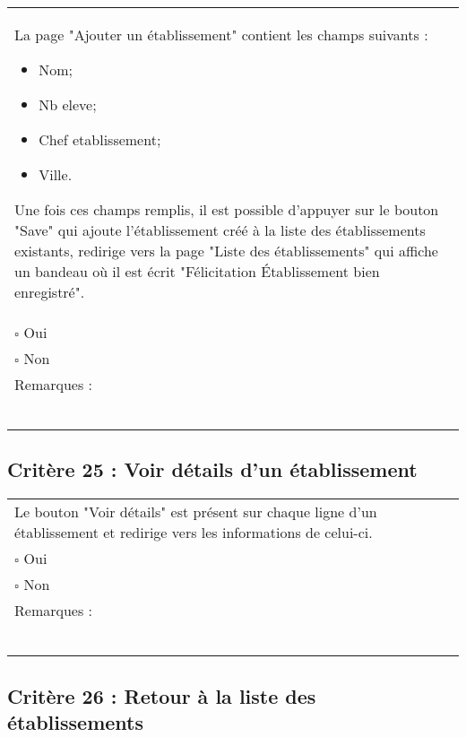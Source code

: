 	\begin{center}
    	 		\begin{tabular}[h]{|p{}|}
			\hline
				La page "Ajouter un établissement"  contient les champs suivants : 
				\begin{itemize}
					\item Nom;
					\item Nb eleve;
					\item Chef etablissement;
					\item Ville.
				\end{itemize}
				Une fois ces champs remplis, il est possible d'appuyer sur le bouton "Save" qui ajoute l'établissement créé à la liste des établissements existants, redirige vers la page "Liste des établissements" qui affiche un bandeau où il est écrit "Félicitation Établissement bien enregistré". \\
				$\square$ Oui  \\ $\square$ Non \\\hline Remarques : \\ ~\\
			 \\\hline
     		\end{tabular}
  		\end{center}	
  		
  		
  		\subsection*{Critère 25 : Voir détails d'un établissement}
	
	\begin{center}
    	 		\begin{tabular}[h]{|p{}|}
			\hline
				Le bouton "Voir détails" est présent sur chaque ligne d'un établissement et redirige vers les informations de celui-ci.\\
				$\square$ Oui  \\ $\square$ Non \\\hline Remarques : \\ ~\\
			 \\\hline
     		\end{tabular}
  		\end{center}	
  		
  		
  		\subsection*{Critère 26 : Retour à la liste des établissements}
	
